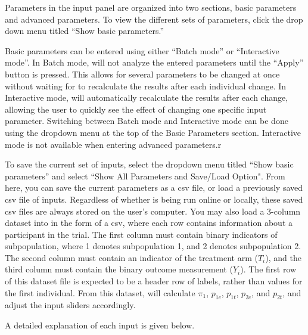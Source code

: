 \documentclass[article]{jss}
\begin{document}
Parameters in the input panel are organized into two sections, basic parameters and advanced parameters. To view the different sets of parameters, click the drop down menu titled “Show basic parameters.” 

Basic parameters can be entered using either “Batch mode” or “Interactive mode”. In Batch mode,  will not analyze the entered parameters until the “Apply” button is pressed. This allows for several parameters to be changed at once without waiting for  to recalculate the results after each individual change. In Interactive mode,  will automatically recalculate the results after each change, allowing the user to quickly see the effect of changing one specific input parameter. Switching between Batch mode and Interactive mode can be done using the dropdown menu at the top of the Basic Parameters section. Interactive mode is not available when entering advanced parameters.r

To save the current set of inputs, select the dropdown menu titled “Show basic parameters” and select “Show All Parameters and Save/Load Option". From here, you can save the current parameters as a csv file, or load a previously saved csv file of inputs. Regardless of whether  is being run online or locally, these saved csv files are always stored on the user's computer. You may also load a 3-column dataset into  in the form of a csv, where each row contains information about a participant in the trial. The first column must contain binary indicators of subpopulation, where 1 denotes subpopulation 1, and 2 denotes subpopulation 2. The second column must contain an indicator of the treatment arm ($T_i$), and the third column must contain the binary outcome measurement ($Y_i$). The first row of this dataset file is expected to be a header row of labels, rather than values for the first individual. From this dataset,  will calculate $π_1$, $p_{1c}$, $p_{1t}$, $p_{2c}$, and $p_{2t}$, and adjust the input sliders accordingly.

A detailed explanation of each input is given below.
\end{document}
